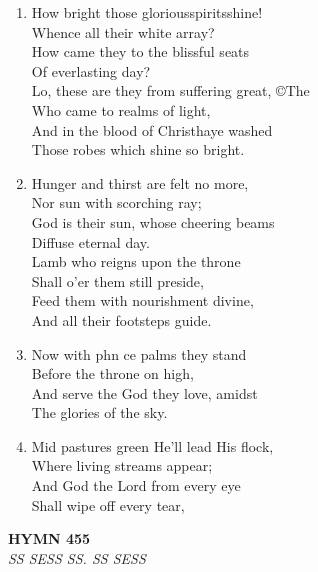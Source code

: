 \documentclass[11pt,a4paper]{article}
\begin{document}
\begin{enumerate}
    \item How bright those gloriousspiritsshine! \\
        Whence all their white array? \\
        How came they to the blissful seats \\
        Of everlasting day? \\
        Lo, these are they from suffering great, ©The \\
        Who came to realms of light, \\
        And in the blood of Christhaye washed \\
        Those robes which shine so bright.

    \item Hunger and thirst are felt no more, \\
        Nor sun with scorching ray; \\
        God is their sun, whose cheering beams \\
        Diffuse eternal day. \\
        Lamb who reigns upon the throne \\
        Shall o'er them still preside, \\
        Feed them with nourishment divine, \\
        And all their footsteps guide.

    \item Now with phn ce palms they stand \\
        Before the throne on high, \\
        And serve the God they love, amidst \\
        The glories of the sky.

    \item Mid pastures green He'll lead His flock, \\
        Where living streams appear; \\
        And God the Lord from every eye \\
        Shall wipe off every tear,

\end{enumerate}

\newpage
\begin{center}
    {\Large \textbf{HYMN 455}}
    \\
    \textit{SS SESS SS. SS SESS}
\end{center}
\vspace{1em}
\end{document}
